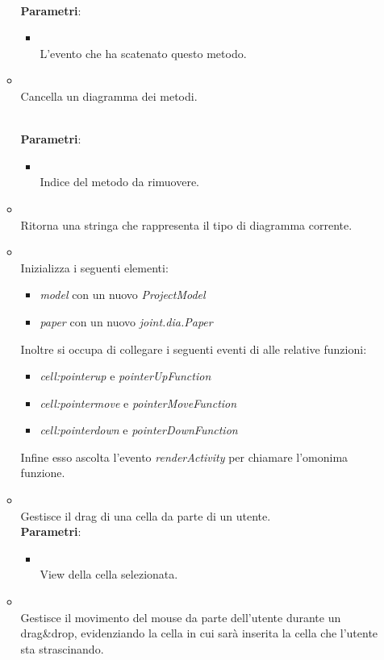 \begin{itemize}
\begin{itemize}
\\ \textbf{Parametri}:
\begin{itemize}
\item {}
\\ L'evento che ha scatenato questo metodo.
\end{itemize}
\item {}
\\ Cancella un diagramma dei metodi.	

\\ \textbf{Parametri}:
\begin{itemize}
\item {}
\\ Indice del metodo da rimuovere.

\end{itemize}
\item {}
\\ Ritorna una stringa che rappresenta il tipo di diagramma corrente.	

\item {}
\\ Inizializza i seguenti elementi: \begin{itemize} \item \emph{model} con un nuovo \emph{ProjectModel} \item \emph{paper} con un nuovo \emph{joint.dia.Paper} \end{itemize} Inoltre si occupa di collegare i seguenti eventi di \jointjs{} alle relative funzioni: \begin{itemize} \item \emph{cell:pointerup} e \emph{pointerUpFunction} \item \emph{cell:pointermove} e \emph{pointerMoveFunction} \item \emph{cell:pointerdown} e \emph{pointerDownFunction} \end{itemize} Infine esso ascolta l'evento \emph{renderActivity} per chiamare l'omonima funzione.	

\item {}
\\ Gestisce il drag di una cella da parte di un utente.
\\ \textbf{Parametri}:
\begin{itemize}
\item {}
\\ View della cella selezionata.
\end{itemize}
\item {}
\\ Gestisce il movimento del mouse da parte dell'utente durante un drag\&drop, evidenziando la cella in cui sarà inserita la cella che l'utente sta strascinando.	


\end{itemize}
\end{itemize}
